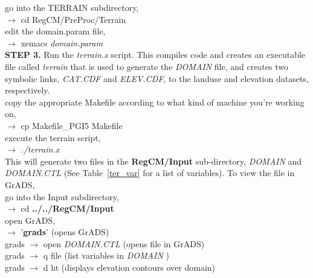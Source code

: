 \noindent
go into the TERRAIN subdirectory, \\

\indent 
$\rightarrow$ cd RegCM/PreProc/Terrain \\ 

\noindent
edit the domain.param file, \\

\indent 
$\rightarrow$ xemacs {\it domain.param} \\


\noindent
{\bf STEP 3.}  Run the {\it terrain.x} script.  This compiles code and 
creates an executable file called {\it terrain} that is used to generate the {\it DOMAIN} 
file, and creates two symbolic links, {\it CAT.CDF} and {\it ELEV.CDF}, 
to the landuse and elevation datasets, respectively.  \\

\noindent
copy the appropriate Makefile according to what kind of machine you're working on, \\

\indent 
$\rightarrow$   {cp Makefile\_PGI5 Makefile} \\

\noindent
execute the terrain script, \\

\indent 
$\rightarrow$   {\it ./terrain.x} \\


\noindent
This will generate two files in the {\bf RegCM/Input} sub-directory, {\it DOMAIN} and 
{\it DOMAIN.CTL} (See Table~\ref{ter_var} for a list of variables). To view the file in GrADS, \\

\noindent
go into the Input subdirectory, \\

\indent
$\rightarrow$   cd {\bf ../../RegCM/Input} \\ 

\noindent
open GrADS, \\

\indent
$\rightarrow$   '{\bf grads}'  (opens GrADS) \\ 

\indent
grads $\rightarrow$   open {\it DOMAIN.CTL} (opens file in GrADS) \\
\indent
grads $\rightarrow$   q file  (list variables in {\it DOMAIN} ) \\
\indent
grads $\rightarrow$   d ht  (displays elevation contours over domain) \\



